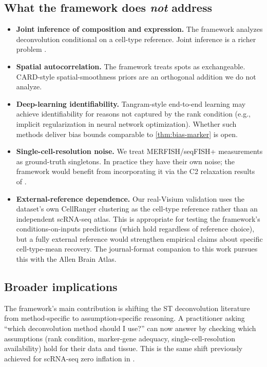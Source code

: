 \subsection{What the framework does \emph{not} address}

\begin{itemize}
\item \textbf{Joint inference of composition and expression.} The
  framework analyzes deconvolution conditional on a cell-type
  reference. Joint inference is a richer problem
  \citep{zhang2023spatially}.

\item \textbf{Spatial autocorrelation.} The framework treats spots as
  exchangeable. CARD-style spatial-smoothness priors are an
  orthogonal addition we do not analyze.

\item \textbf{Deep-learning identifiability.} Tangram-style
  end-to-end learning may achieve identifiability for reasons not
  captured by the rank condition (e.g., implicit regularization in
  neural network optimization). Whether such methods deliver bias
  bounds comparable to \cref{thm:bias-marker} is open.

\item \textbf{Single-cell-resolution noise.} We treat MERFISH/seqFISH+
  measurements as ground-truth singletons. In practice they have
  their own noise; the framework would benefit from incorporating it
  via the C2 relaxation results of \cite{towell2026mdrelax}.

\item \textbf{External-reference dependence.} Our real-Visium
  validation uses the dataset's own CellRanger clustering as the
  cell-type reference rather than an independent scRNA-seq atlas.
  This is appropriate for testing the framework's
  conditions-on-inputs predictions (which hold regardless of
  reference choice), but a fully external reference would strengthen
  empirical claims about specific cell-type-mean recovery. The
  journal-format companion to this work pursues this with the Allen
  Brain Atlas.
\end{itemize}

\subsection{Broader implications}

The framework's main contribution is shifting the ST deconvolution
literature from method-specific to assumption-specific reasoning. A
practitioner asking ``which deconvolution method should I use?'' can
now answer by checking which assumptions (rank condition, marker-gene
adequacy, single-cell-resolution availability) hold for their data
and tissue. This is the same shift previously achieved for scRNA-seq
zero inflation in \cite{towell2026scrnacoarsening}.

